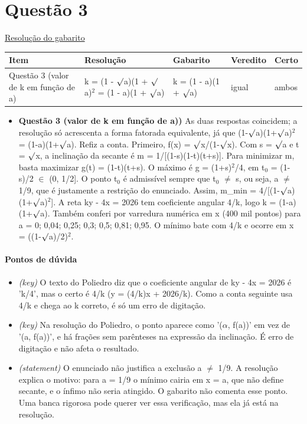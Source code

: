 \documentclass{article}%
\begin{document}
\section*{Questão 3}%
\href{https://poliedroresolve.sistemapoliedro.com.br/vestibulares/ime/2026/ime-2-fase-dia-1-23-10-2025-2-fase-dia-1/dissertativa-3-matematica-2-fase-dia-1-ime-2026}{Resolução do gabarito}\par\smallskip%
\begin{longtable}{@{}p{} p{} p{} p{} p{}@{}}\toprule Item & Resolução & Gabarito & Veredito & Certo \\ \midrule
Questão 3 (valor de k em função de a) & k = (1 - $\surd$a)(1 + $\surd$a)$^2$ = (1 - a)(1 + $\surd$a) & k = (1 - a)(1 + $\surd$a) & igual & ambos \\
\bottomrule\end{longtable}%
\begin{itemize}%
\item%
\textbf{Questão 3 (valor de k em função de a))} As duas respostas coincidem; a resolução só acrescenta a forma fatorada equivalente, já que (1-$\surd$a)(1+$\surd$a)$^2$ = (1-a)(1+$\surd$a). Refiz a conta. Primeiro, f(x) = $\surd$x/(1-$\surd$x). Com s = $\surd$a e t = $\surd$x, a inclinação da secante é m = 1/{[}(1-s)(1-t)(t+s){]}. Para minimizar m, basta maximizar g(t) = (1-t)(t+s). O máximo é g = (1+s)$^2$/4, em t$_{0}$ = (1-s)/2 $\in$ (0, 1/2{]}. O ponto t$_{0}$ é admissível sempre que t$_{0}$ $\neq$ s, ou seja, a $\neq$ 1/9, que é justamente a restrição do enunciado. Assim, m\_min = 4/{[}(1-$\surd$a)(1+$\surd$a)$^2${]}. A reta ky - 4x = 2026 tem coeficiente angular 4/k, logo k = (1-a)(1+$\surd$a). Também conferi por varredura numérica em x (400 mil pontos) para a = 0; 0,04; 0,25; 0,3; 0,5; 0,81; 0,95. O mínimo bate com 4/k e ocorre em x = ((1-$\surd$a)/2)$^2$.%
\end{itemize}%
\paragraph{Pontos de dúvida}%
\begin{itemize}%
\item%
\textit{(key)} O texto do Poliedro diz que o coeficiente angular de ky - 4x = 2026 é 'k/4', mas o certo é 4/k (y = (4/k)x + 2026/k). Como a conta seguinte usa 4/k e chega ao k correto, é só um erro de digitação.%
\item%
\textit{(key)} Na resolução do Poliedro, o ponto aparece como '($\alpha$, f(a))' em vez de '(a, f(a))', e há frações sem parênteses na expressão da inclinação. É erro de digitação e não afeta o resultado.%
\item%
\textit{(statement)} O enunciado não justifica a exclusão a $\neq$ 1/9. A resolução explica o motivo: para a = 1/9 o mínimo cairia em x = a, que não define secante, e o ínfimo não seria atingido. O gabarito não comenta esse ponto. Uma banca rigorosa pode querer ver essa verificação, mas ela já está na resolução.%
\end{itemize}%
\end{document}
